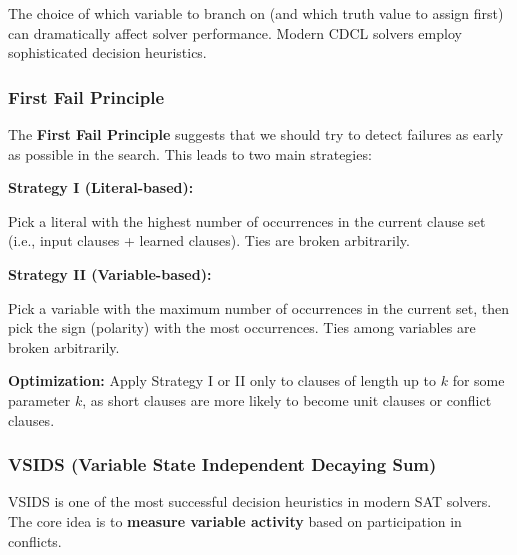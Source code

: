 \documentclass[11pt,a4paper]{article}
\theoremstyle{definition}
\theoremstyle{plain}
\theoremstyle{remark}
\begin{document}
The choice of which variable to branch on (and which truth value to assign first) can dramatically affect solver performance. Modern CDCL solvers employ sophisticated decision heuristics.

\subsubsection{First Fail Principle}

The \textbf{First Fail Principle} suggests that we should try to detect failures as early as possible in the search. This leads to two main strategies:

\begin{tcolorbox}[colback=green!5!white,colframe=green!75!black,title=\textbf{First Fail Heuristics}]
\textbf{Strategy I (Literal-based):}

Pick a literal with the highest number of occurrences in the current clause set (i.e., input clauses + learned clauses). Ties are broken arbitrarily.

\vspace{0.5em}

\textbf{Strategy II (Variable-based):}

Pick a variable with the maximum number of occurrences in the current set, then pick the sign (polarity) with the most occurrences. Ties among variables are broken arbitrarily.
\end{tcolorbox}

\textbf{Optimization:} Apply Strategy I or II only to clauses of length up to $k$ for some parameter $k$, as short clauses are more likely to become unit clauses or conflict clauses.

\subsubsection{VSIDS (Variable State Independent Decaying Sum)}

VSIDS is one of the most successful decision heuristics in modern SAT solvers. The core idea is to \textbf{measure variable activity} based on participation in conflicts.
\end{document}
